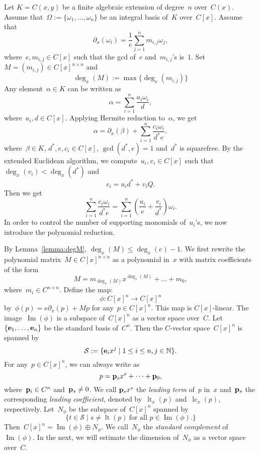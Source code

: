 \documentclass{sig-alternate}
\newtheorem{lemma}[theorem]{Lemma}
\newcommand{\red}{\color{red}}
\newcommand{\bN}{ {\mathbb N}}
\newcommand{\cS}{ {\mathcal S}}
\newcommand{\ve} {{\bf e}}
\newcommand{\vp} {{\bf p}}
\def\lc{\operatorname{lc}}
\def\lt{\operatorname{lt}}
\def\im{\operatorname{Im}}
\begin{document}
Let $K= C(x, y)$ be a finite algebraic extension of degree~$n$ over~$C(x)$.
Assume that~$\Omega:=\{\omega_1, \ldots, \omega_n\}$ be an integral basis of~$K$
over~$C[x]$.  Assume that
\[\partial_x(\omega_i) = \frac{1}{e}\sum_{j=1}^n m_{i, j}\omega_j,\]
where~$e, m_{i, j}\in C[x]$ such that the gcd of~$e$ and~$m_{i,j}$'s is~$1$.
Set~$M=(m_{i, j})\in C[x]^{n\times n}$
and
\[\deg_x(M):= \max\{\deg_x(m_{i, j})\}\]
Any element~$\alpha\in K$ can be written as
\[\alpha = \sum_{i=1}^n \frac{a_i\omega_i}{d},\]
where~$a_i, d\in C[x]$. Applying Hermite reduction to~$\alpha$, we get
\[\alpha = \partial_x(\beta) + \sum_{i=1}^n \frac{c_i\omega_i}{d^*e},\]
where~$\beta\in K$, $d^*, e, c_i\in C[x]$, $\gcd(d^*, e)=1$ and~$d^*$ is squarefree.
By the extended Euclidean algorithm, we compute~$u_i, v_i\in C[x]$ such that
$\deg_x(v_i) < \deg_x(d^*)$ and
\[c_i = u_i d^* + v_i Q.\]
Then we get
\[ \sum_{i=1}^n \frac{c_i\omega_i}{d^*e} =  \sum_{i=1}^n \left(\frac{u_i}{e} + \frac{v_i}{d^*}\right)\omega_i.\]
In order to control the number of supporting monomials of~$u_i$'s, we now introduce the polynomial reduction.

By Lemma~\ref{lemma:degM}, $\deg_x(M)\leq \deg_x(e)-1$.
We first rewrite the polynomial matrix~$M\in C[x]^{n\times n}$ as a polynomial in~$x$
with matrix coefficients of the form
\[M = m_{\deg_x(M)}x^{\deg_x(M)} + \ldots + m_0, \]
where~$m_i\in C^{n\times n}$. Define the map:
\[\phi: C[x]^n \rightarrow C[x]^n\]
by~$\phi(p)= e\partial_x(p) + Mp$ for any~$p\in C[x]^n$. This map is $C[x]$-linear.
The image~$\im(\phi)$ is a subspace of~$C[x]^n$ as a vector space over~$C$.
Let~$\{\ve_1, \ldots, \ve_n\}$ be the standard basis of~$C^n$. Then the $C$-vector space~$C[x]^n$
is spanned by
\[\cS := \{\ve_ix^j \mid 1\leq i \leq n, j\in \bN\}.\]
For any~$p \in C[x]^n$, we can always write as
\[p = \vp_sx^s + \cdots + \vp_0,\]
where~$\vp_i\in C^n$ and~$\vp_s \neq 0$. We call $\vp_sx^s$
the \emph{leading term} of~$p$ in~$x$ and~$\vp_s$ the corresponding \emph{leading coefficient},
denoted by~$\lt_x(p)$ and~$\lc_x(p)$, respectively.
Let~$N_\phi$ be the subspace of~$C[x]^n$ spanned by
\[\{t \in \cS \mid s\neq \lt(p) ~\text{for all~$p\in \im(\phi)$}. \}\]
Then~$C[x]^n = \im(\phi) \oplus N_\phi$. We call~$N_{\phi}$ the \emph{standard complement} of~$\im(\phi)$.
In the next, we will estimate the dimension of~$N_\phi$ as a vector space over~$C$.
\end{document}

